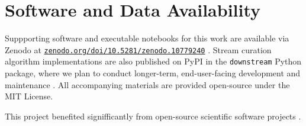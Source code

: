 \section{Software and Data Availability}

Suppporting software and executable notebooks for this work are available via Zenodo at \href{https://zenodo.org/doi/10.5281/zenodo.10779240}{\texttt{zenodo.org/doi/10.5281/zenodo.10779240}} \citep{moreno2024hsurf}.
Stream curation algorithm implementations are also published on PyPI in the \texttt{downstream} Python package, where we plan to conduct longer-term, end-user-facing development and maintenance \citep{moreno2024downstream}.
All accompanying materials are provided open-source under the MIT License.

This project benefited signifficantly from open-source scientific software projects \citep{2020SciPy-NMeth,harris2020array,reback2020pandas,mckinney-proc-scipy-2010,waskom2021seaborn,hunter2007matplotlib,moreno2023teeplot}.
